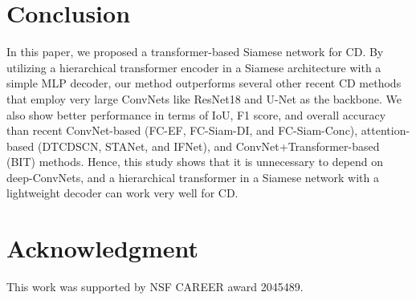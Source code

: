\documentclass{article}
\begin{document}
\section{Conclusion}
\label{sec:con}
In this paper, we proposed a transformer-based Siamese network for CD. By utilizing a hierarchical transformer encoder in a Siamese architecture with a simple MLP decoder, our method outperforms several other recent CD methods that employ very large ConvNets like ResNet18 and U-Net as the backbone. We also show better performance in terms of IoU, F1 score, and overall accuracy than recent ConvNet-based (FC-EF, FC-Siam-DI, and FC-Siam-Conc), attention-based (DTCDSCN, STANet, and IFNet), and ConvNet+Transformer-based (BIT) methods. Hence, this study shows that it is unnecessary to depend on deep-ConvNets, and a hierarchical transformer in a Siamese network with a lightweight decoder can work very well for CD.

\section{Acknowledgment}
This work was supported by NSF CAREER award 2045489.

\let\oldthebibliography\thebibliography
\let\endoldthebibliography\endthebibliography
\renewenvironment{thebibliography}[1]{
  \begin{oldthebibliography}{#1}
    \setlength{\itemsep}{0em}
    \setlength{\parskip}{0em}
}
{
  \end{oldthebibliography}
}

   

\end{document}
